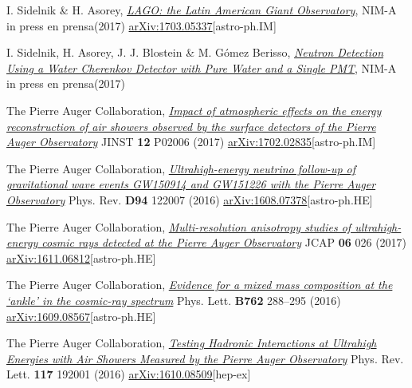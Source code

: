\begin{etaremune}
\item {}I. Sidelnik \& H. Asorey, \href{https://doi.org/10.1016/j.nima.2017.02.069}{\emph{LAGO: the Latin American Giant Observatory}}, NIM-A \ifeng in press \else en prensa\fi (2017) \href{http://arxiv.org/abs/1703.05337}{arXiv:1703.05337}[astro-ph.IM]

\item {} I. Sidelnik, H. Asorey, J. J. Blostein \& M. Gómez Berisso, \href{https://doi.org/10.1016/j.nima.2017.02.048}{\emph{Neutron Detection Using a Water Cherenkov Detector with Pure Water and a Single PMT}}, NIM-A \ifeng in press \else en prensa\fi (2017)

\item {}The Pierre Auger Collaboration, \href{https://doi.org/10.1088/1748-0221/12/02/P02006}{\emph{Impact of atmospheric effects on the energy reconstruction of air showers observed by the surface detectors of the Pierre Auger Observatory}} JINST {\bf 12} P02006 (2017) \href{http://arxiv.org/abs/1702.02835}{arXiv:1702.02835}[astro-ph.IM]

\item {}The Pierre Auger Collaboration, \href{https://doi.org/10.1103/PhysRevD.94.122007}{\emph{Ultrahigh-energy neutrino follow-up of gravitational wave events GW150914 and GW151226 with the Pierre Auger Observatory}} Phys. Rev. {\bf D94} 122007 (2016) \href{http://arxiv.org/abs/1608.07378}{arXiv:1608.07378}[astro-ph.HE]

\item {}The Pierre Auger Collaboration, \href{https://doi.org/10.1088/1475-7516/2017/06/026}{\emph{Multi-resolution anisotropy studies of ultrahigh-energy cosmic rays detected at the Pierre Auger Observatory}} JCAP {\bf 06} 026 (2017) \href{http://arxiv.org/abs/1611.06812}{arXiv:1611.06812}[astro-ph.HE]

\item {}The Pierre Auger Collaboration, \href{http://dx.doi.org/10.1016/j.physletb.2016.09.039}{\emph{Evidence for a mixed mass composition at the ‘ankle’ in the cosmic-ray spectrum}} Phys. Lett. {\bf B762} 288--295 (2016) \href{http://arxiv.org/abs/1609.08567}{arXiv:1609.08567}[astro-ph.HE]

\item {}The Pierre Auger Collaboration, \href{https://doi.org/10.1103/PhysRevLett.117.192001}{\emph{Testing Hadronic Interactions at Ultrahigh Energies with Air Showers Measured by the Pierre Auger Observatory}} Phys. Rev. Lett.  {\bf 117} 192001 (2016) \href{http://arxiv.org/abs/1610.08509}{arXiv:1610.08509}[hep-ex]


\end{etaremune}
